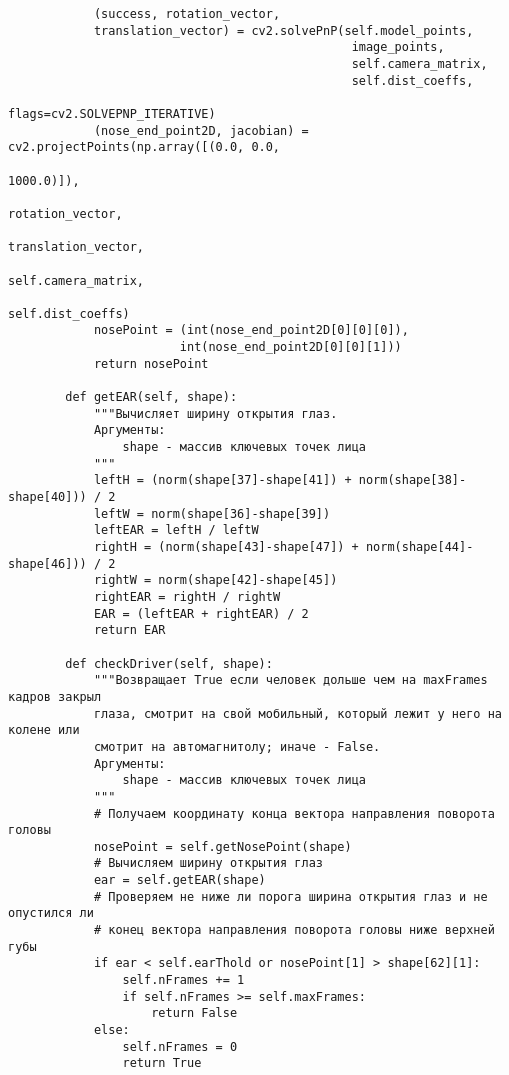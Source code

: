 \begin{verbatim}
            (success, rotation_vector,
            translation_vector) = cv2.solvePnP(self.model_points,
                                                image_points,
                                                self.camera_matrix,
                                                self.dist_coeffs,
                                                flags=cv2.SOLVEPNP_ITERATIVE)
            (nose_end_point2D, jacobian) = cv2.projectPoints(np.array([(0.0, 0.0,
                                                                        1000.0)]),
                                                            rotation_vector,
                                                            translation_vector,
                                                            self.camera_matrix,
                                                            self.dist_coeffs)
            nosePoint = (int(nose_end_point2D[0][0][0]),
                        int(nose_end_point2D[0][0][1]))
            return nosePoint

        def getEAR(self, shape):
            """Вычисляет ширину открытия глаз.
            Аргументы:
                shape - массив ключевых точек лица
            """
            leftH = (norm(shape[37]-shape[41]) + norm(shape[38]-shape[40])) / 2
            leftW = norm(shape[36]-shape[39])
            leftEAR = leftH / leftW
            rightH = (norm(shape[43]-shape[47]) + norm(shape[44]-shape[46])) / 2
            rightW = norm(shape[42]-shape[45])
            rightEAR = rightH / rightW
            EAR = (leftEAR + rightEAR) / 2
            return EAR

        def checkDriver(self, shape):
            """Возвращает True если человек дольше чем на maxFrames кадров закрыл
            глаза, смотрит на свой мобильный, который лежит у него на колене или
            смотрит на автомагнитолу; иначе - False.
            Аргументы:
                shape - массив ключевых точек лица
            """
            # Получаем координату конца вектора направления поворота головы
            nosePoint = self.getNosePoint(shape)
            # Вычисляем ширину открытия глаз
            ear = self.getEAR(shape)
            # Проверяем не ниже ли порога ширина открытия глаз и не опустился ли
            # конец вектора направления поворота головы ниже верхней губы
            if ear < self.earThold or nosePoint[1] > shape[62][1]:
                self.nFrames += 1
                if self.nFrames >= self.maxFrames:
                    return False
            else:
                self.nFrames = 0
                return True



\end{verbatim}
